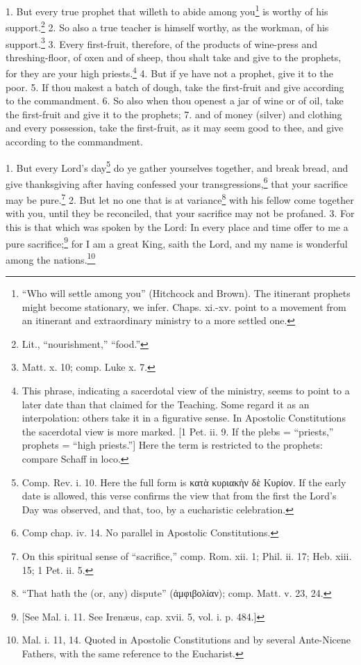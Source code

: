 1. But every true prophet that willeth to abide among you\footnote{\par  “Who will settle among you” (Hitchcock and Brown). The itinerant prophets might become stationary, we infer. Chaps. xi.-xv. point to a movement from an itinerant and extraordinary ministry to a more settled one.} is worthy of his support.\footnote{\par  Lit., “nourishment,” “food.”} 2. So also a true teacher is himself worthy, as the workman, of his support.\footnote{\par  Matt. x. 10; comp. Luke x. 7.} 3. Every first-fruit, therefore, of the products of wine-press and threshing-floor, of oxen and of sheep, thou shalt take and give to the prophets, for they are your high priests.\footnote{\par  This phrase, indicating a sacerdotal view of the ministry, seems to point to a later date than that claimed for the Teaching. Some regard it as an interpolation: others take it in a figurative sense. In Apostolic Constitutions the sacerdotal view is more marked. [1 Pet. ii. 9. If the plebs = “priests,” prophets = “high priests.”] Here the term is restricted to the prophets: compare Schaff in loco.} 4. But if ye have not a prophet, give it to the poor. 5. If thou makest a batch of dough, take the first-fruit and give according to the commandment. 6. So also when thou openest a jar of wine or of oil, take the first-fruit and give it to the prophets; 7. and of money (silver) and clothing and every possession, take the first-fruit, as it may seem good to thee, and give according to the commandment.


1. But every Lord’s day\footnote{\par  Comp. Rev. i. 10. Here the full form is \textgreek{κατὰ κυριακὴν δὲ Κυρίον}. If the early date is allowed, this verse confirms the view that from the first the Lord’s Day was observed, and that, too, by a eucharistic celebration.} do ye gather yourselves together, and break bread, and give thanksgiving after having confessed your transgressions,\footnote{\par  Comp chap. iv. 14. No parallel in Apostolic Constitutions.} that your sacrifice may be pure.\footnote{\par  On this spiritual sense of “sacrifice,” comp. Rom. xii. 1; Phil. ii. 17; Heb. xiii. 15; 1 Pet. ii. 5.} 2. But let no one that is at variance\footnote{\par  “That hath the (or, any) dispute” (\textgreek{ἀμφιβολίαν}); comp. Matt. v. 23, 24.} with his fellow come together with you, until they be reconciled, that your sacrifice may not be profaned. 3. For this is that which was spoken by the Lord: In every place and time offer to me a pure sacrifice;\footnote{\par{}  [See Mal. i. 11. See Irenæus, cap. xvii. 5, vol. i. p. 484.]} for I am a great King, saith the Lord, and my name is wonderful among the nations.\footnote{\par  Mal. i. 11, 14. Quoted in Apostolic Constitutions and by several Ante-Nicene Fathers, with the same reference to the Eucharist.}

